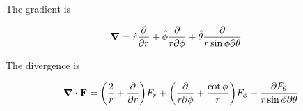 \documentclass[11pt]{article}
\begin{document}
The gradient is

\begin{align}
  \grad &= \hat r \frac{\partial}{\partial r} + \hat\phi \frac{\partial}{r\partial\phi} + \hat\theta \frac{\partial}{r\sin\phi\partial\theta}
\end{align}

The divergence is

\begin{align}
  \div{\vb{F}} = \qty( \frac{2}{r} + \frac{\partial}{\partial r} ) F_r + \qty( \frac{\partial}{r\partial\phi} + \frac{\cot\phi}{r} ) F_\phi + \frac{\partial F_\theta}{r\sin\phi\partial\theta}
\end{align}



\end{document}
